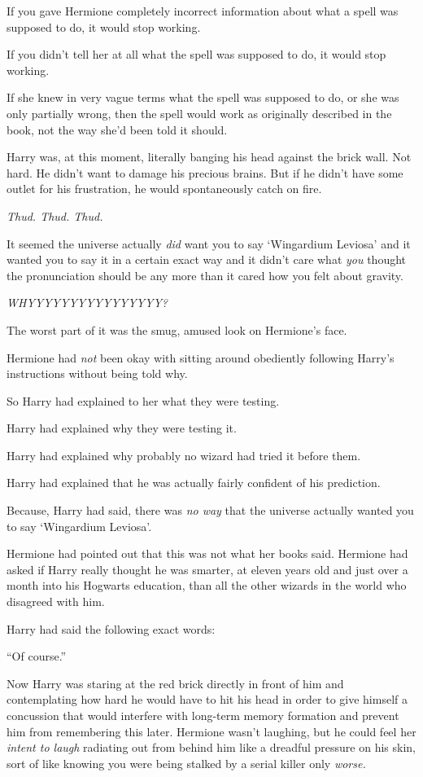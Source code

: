 If you gave Hermione completely incorrect information about what a spell
was supposed to do, it would stop working.

If you didn't tell her at all what the spell was supposed to do, it
would stop working.

If she knew in very vague terms what the spell was supposed to do, or
she was only partially wrong, then the spell would work as originally
described in the book, not the way she'd been told it should.

Harry was, at this moment, literally banging his head against the brick
wall. Not hard. He didn't want to damage his precious brains. But if he
didn't have some outlet for his frustration, he would spontaneously
catch on fire.

\emph{Thud. Thud. Thud.}

It seemed the universe actually \emph{did} want you to say `Wingardium
Leviosa' and it wanted you to say it in a certain exact way and it
didn't care what \emph{you} thought the pronunciation should be any more
than it cared how you felt about gravity.

\emph{WHYYYYYYYYYYYYYYYY?}

The worst part of it was the smug, amused look on Hermione's face.

Hermione had \emph{not} been okay with sitting around obediently
following Harry's instructions without being told why.

So Harry had explained to her what they were testing.

Harry had explained why they were testing it.

Harry had explained why probably no wizard had tried it before them.

Harry had explained that he was actually fairly confident of his
prediction.

Because, Harry had said, there was \emph{no way} that the universe
actually wanted you to say `Wingardium Leviosa'.

Hermione had pointed out that this was not what her books said. Hermione
had asked if Harry really thought he was smarter, at eleven years old
and just over a month into his Hogwarts education, than all the other
wizards in the world who disagreed with him.

Harry had said the following exact words:

``Of course.''

Now Harry was staring at the red brick directly in front of him and
contemplating how hard he would have to hit his head in order to give
himself a concussion that would interfere with long-term memory
formation and prevent him from remembering this later. Hermione wasn't
laughing, but he could feel her \emph{intent to laugh} radiating out
from behind him like a dreadful pressure on his skin, sort of like
knowing you were being stalked by a serial killer only \emph{worse.}

